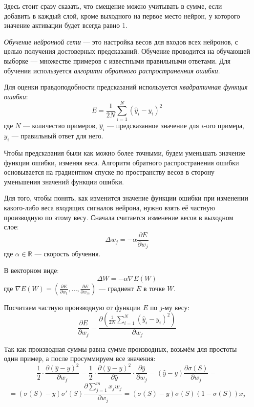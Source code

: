 	Здесь стоит сразу сказать, что смещение можно учитывать в сумме, если добавить в каждый слой, кроме выходного
	на первое место нейрон, у которого значение активации будет всегда равно 1.

	\textit{Обучение нейронной сети} --- это настройка весов для входов всех нейронов, с целью получения достоверных предсказаний.
	Обучение проводится на обучающей выборке --- множестве примеров с известными правильными ответами.
	Для обучения используется \textit{алгоритм обратного распространенния ошибки}.

	Для оценки правдоподобности предсказаний используется \textit{квадратичная функция ошибки}:
	\[
		E = \frac{1}{2N}\sum_{i = 1}^N \left(\hat y_i - y_i\right)^2
	\]
	где $N$ --- количество примеров, $\hat y_i$ --- предсказанное значение для $i$-ого примера, $y_i$ --- правильный ответ для него.

	Чтобы предсказания были как можно более точными, будем уменьшать значение функции ошибки, изменяя веса.
	Алгоритм обратного распространения ошибки основывается на градиентном спуске по пространству весов в сторону уменьшения
	значений функции ошибки.

	Для того, чтобы понять, как изменится значение функции ошибки при изменении какого-либо веса входящих сигналов нейрона,
	нужно взять её частную производную по этому весу.
	Сначала считается изменение весов в выходном слое:
	\[
		\Delta w_j = -\alpha\frac{\partial E}{\partial w_j}
	\]
	где $\alpha \in \mathbb R$ --- скорость обучения.

	В векторном виде:
	\[
		\Delta W = -\alpha\nabla E\left(W\right)
	\]
	где $\nabla E\left(W\right) = \left(\frac{\partial E}{\partial w_1},\dots,\frac{\partial E}{\partial w_m}\right)$ --- градиент $E$ в точке $W$.

	Посчитаем частную производную от функции $E$ по $j$-му весу:
	\[
		\frac{\partial E}{\partial w_j}	= \frac{\partial\left(\frac{1}{2N}\sum_{i = 1}^N \left(\hat y_i - y_i\right)^2\right)}{\partial w_j}
	\]
	
	Так как производная суммы равна сумме производных, возьмём для простоты один пример, а после просуммируем все значения:
	\[
		\frac{1}{2}\cdot\frac{\partial{\left(\hat y - y\right)^2}}{\partial w_j} =
		\frac{1}{2}\cdot\frac{\partial\left(\hat y - y\right)^2}{\partial\hat y}\cdot\frac{\partial\hat y}{\partial w_j} =
		\left(\hat y - y\right)\frac{\partial\sigma\left(S\right)}{\partial w_j} =
	\]
	\[
		= \left(\sigma\left(S\right) - y\right)\sigma\prime\left(S\right)\frac{\partial\sum_{j = 1}^m x_j w_j}{\partial w_j} =
		\left(\sigma\left(S\right) - y\right)\sigma\left(S\right)\left(1 - \sigma\left(S\right)\right) x_j
	\]


